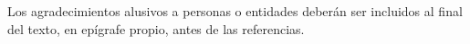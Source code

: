 \documentclass[11pt, a4paper, twoside]{article}
\begin{document}
Los agradecimientos alusivos a personas o entidades deberán ser incluidos al final del texto, en epígrafe propio, antes de las referencias.

\renewcommand{\refname}{Referencias} 


\end{document}

